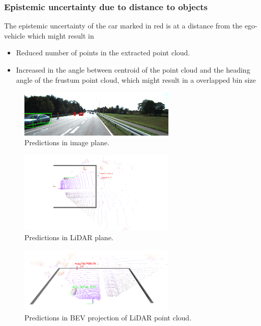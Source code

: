 \documentclass[10pt,twocolumn,letterpaper]{article}
\begin{document}
\subsubsection{Epistemic uncertainty due to distance to objects}
The epistemic uncertainty of the car marked in red is at a distance from the ego-vehicle which might result in
        \begin{itemize}
            \item Reduced number of points in the extracted point cloud.
            \item Increased in the angle between centroid of the point cloud and the heading angle of the frustum point cloud, which might result in a overlapped bin size 
        \end{itemize}
\begin{figure}[!htbp]
        \centering
		\includegraphics[width=75mm, scale = 0.4]{images/Uncertainty_results/3535_distance_-bbox.png}
        \caption[Extracted frustum point cloud after Normalization]{Predictions in image plane.}
        \label{fig:Uncert_blockage-1}
\end{figure}
\begin{figure}[!htbp]
        \centering
		\includegraphics[width=75mm, scale = 0.4]{images/Uncertainty_results/3535_Follow_cam_view.png}
        \caption[Extracted frustum point cloud after Normalization]{Predictions in LiDAR plane.}
        \label{fig:Uncert_blockage-1}
\end{figure}
\begin{figure}[!htbp]
        \centering
		\includegraphics[width=75mm,scale = 0.4]{images/Uncertainty_results/3535_distance.png}
        \caption[Extracted frustum point cloud after Normalization]{Predictions in BEV projection of LiDAR point cloud.}
        \label{fig:Uncert_blockage-1}
\end{figure}
\end{document}
